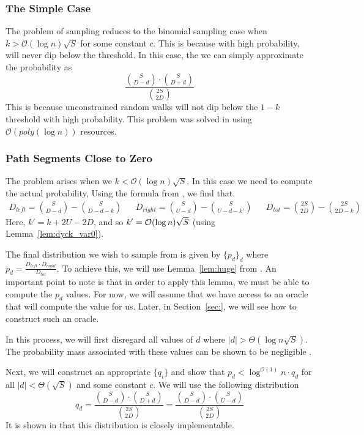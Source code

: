 \subsubsection{The Simple Case}
The problem of sampling reduces to the binomial sampling case when $k > \mathcal{O}(\log n)\sqrt S$ for some constant $c$.
This is because with high probability, will never dip below the threshold.
In this case, the we can simply approximate the probability as
$$
\frac{{{S}\choose{D-d}}\cdot{{S}\choose{D+d}}}{{{2S}\choose{2D}}}
$$
This is because unconstrained random walks will not dip below the $1-k$ threshold with high probability.
This problem was solved in \cite{huge} using $\mathcal O(poly(\log n))$ resources.

\subsubsection{Path Segments Close to Zero}
The problem arises when we $k <\mathcal{O}(\log n)\sqrt{S}$. In this case we need to compute the actual probability,
Using the formula from \cite{trap}, we find that.
{\scriptsize
    \begin{align}
        D_{left} = {{S}\choose{D-d}}-{{S}\choose{D-d-k}}
        &&D_{right} = {{S}\choose{U-d}}-{{S}\choose{U-d-k'}}
        &&D_{tot} = {{2S}\choose{2D}}-{{2S}\choose{2D-k}}
    \end{align}
}
Here, $k' = k+2U-2D$, and so $k' = \Bo(\log n)\sqrt S$ (using Lemma~\ref{lem:dyck_var0}).

The final distribution we wish to sample from is given by $\{p_d\}_d$ where $p_d = \frac{D_{left}\cdot D_{right}}{D_{tot}}$.
To achieve this, we will use Lemma~\ref{lem:huge} from \cite{huge}.
An important point to note is that in order to apply this lemma, we must be able to compute the $p_d$ values.
For now, we will assume that we have access to an oracle that will compute the value for us.
Later, in Section~\ref{sec:}, we will see how to construct such an oracle.

In this process, we will first disregard all values of $d$ where $|d|>\Theta(\log n\sqrt S)$.
The probability mass associated with these values can be shown to be negligible .

Next, we will construct an appropriate $\{q_i\}$ and show that $p_d < \log^{\mathcal{O}(1)} n\cdot q_d$
for all $|d|<\Theta(\sqrt S)$ and some constant $c$.
We will use the following distribution
$$
q_d = \frac{{S\choose D-d}\cdot{S\choose D+d}}{{2S\choose 2D}} = \frac{{S\choose D-d}\cdot{S\choose U-d}}{{2S\choose 2D}}
$$
It is shown in \cite{huge} that this distribution is closely implementable.

